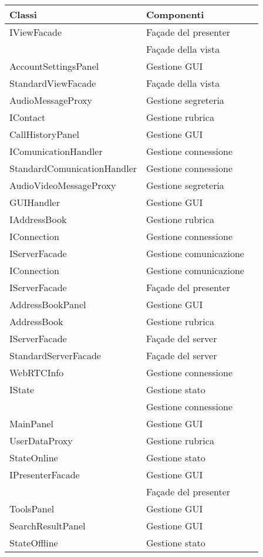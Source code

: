 \begin{center}
\begin{longtable}{lp{}l}
\toprule Classi & Componenti\\
\midrule
IViewFacade & Façade del presenter \\
 & Façade della vista \\
AccountSettingsPanel & Gestione GUI \\
StandardViewFacade & Façade della vista \\
AudioMessageProxy & Gestione segreteria \\
IContact & Gestione rubrica \\
CallHistoryPanel & Gestione GUI \\
IComunicationHandler & Gestione connessione \\
StandardComunicationHandler & Gestione connessione \\
AudioVideoMessageProxy & Gestione segreteria \\
GUIHandler & Gestione GUI \\
IAddressBook & Gestione rubrica \\
IConnection & Gestione connessione \\
IServerFacade & Gestione comunicazione \\
IConnection & Gestione comunicazione \\
IServerFacade & Façade del presenter \\
AddressBookPanel & Gestione GUI \\
AddressBook & Gestione rubrica \\
IServerFacade & Façade del server \\
StandardServerFacade & Façade del server \\
WebRTCInfo & Gestione connessione \\
IState & Gestione stato \\
 & Gestione connessione \\
MainPanel & Gestione GUI \\
UserDataProxy & Gestione rubrica \\
StateOnline & Gestione stato \\
IPresenterFacade & Gestione GUI \\
 & Façade del presenter \\
ToolsPanel & Gestione GUI \\
SearchResultPanel & Gestione GUI \\
StateOffline & Gestione stato \\

\end{longtable}
\end{center}
